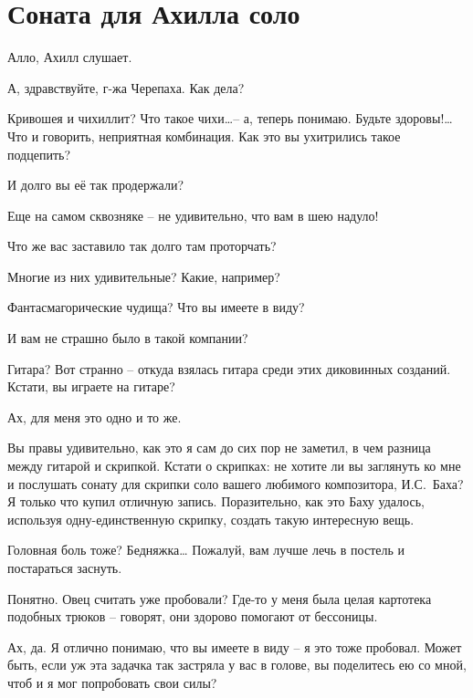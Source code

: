 \documentclass[../main.tex]{subfiles}
\begin{document}
\section{Соната для Ахилла соло}


\begin{dialogue}

 Алло, Ахилл слушает.

 А, здравствуйте, г-жа Черепаха. Как дела?

 Кривошея и чихиллит? Что такое чихи\ldots \--- а, теперь понимаю. Будьте здоровы!\ldots{} Что и говорить, неприятная комбинация. Как это вы ухитрились такое подцепить?

 И долго вы её так продержали?

 Еще на самом сквозняке \--- не удивительно, что вам в шею надуло!

 Что же вас заставило так долго там проторчать?

 Многие из них удивительные? Какие, например?

 Фантасмагорические чудища? Что вы имеете в виду?

 И вам не страшно было в такой компании?

 Гитара? Вот странно \--- откуда взялась гитара среди этих диковинных созданий. Кстати, вы играете на гитаре?

 Ах, для меня это одно и то же.

 Вы правы удивительно, как это я сам до сих пор не заметил, в чем разница между гитарой и скрипкой. Кстати о скрипках: не хотите ли вы заглянуть ко мне и послушать сонату для скрипки соло вашего любимого композитора, И.С.~Баха? Я только что купил отличную запись. Поразительно, как это Баху удалось, используя одну-единственную скрипку, создать такую интересную вещь.

 Головная боль тоже? Бедняжка\ldots{} Пожалуй, вам лучше лечь в постель и постараться заснуть.

 Понятно. Овец считать уже пробовали? Где-то у меня была целая картотека подобных трюков \--- говорят, они здорово помогают от бессоницы.

 Ах, да. Я отлично понимаю, что вы имеете в виду \--- я это тоже пробовал. Может быть, если уж эта задачка так застряла у вас в голове, вы поделитесь ею со мной, чтоб и я мог попробовать свои силы?


\end{dialogue}
\end{document}
